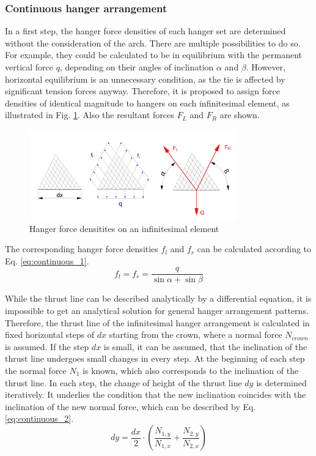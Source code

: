 \subsubsection{Continuous hanger arrangement}\label{app:continuous}
In a first step, the hanger force densities of each hanger set are determined without the consideration of the arch. There are multiple possibilities to do so. For example, they could be calculated to be in equilibrium with the permanent vertical force $q$, depending on their angles of inclination $\alpha$ and $\beta$. However, horizontal equilibrium is an unnecessary condition, as the tie is affected by significant tension forces anyway. Therefore, it is proposed to assign force densities of identical magnitude to hangers on each infinitesimal element, as illustrated in Fig. \ref{fig:continuous_1}. Also the resultant forces $F_L$ and $F_R$ are shown.
\begin{figure}[H]
    \centering
    \includegraphics[width=0.8\textwidth]{overleaf/Appendix/Pictures/continuous_thrust_line_1.PNG}
    \caption{Hanger force densitites on an infinitesimal element}
    \label{fig:continuous_1}
\end{figure}

The corresponding hanger force densities $f_l$ and $f_r$ can be calculated according to Eq. \eqref{eq:continuous_1}.
\begin{equation}
    f_l=f_r=\frac{q}{\sin{\alpha}+ \sin{\beta}}
    \label{eq:continuous_1}
\end{equation}

While the thrust line can be described analytically by a differential equation, it is impossible to get an analytical solution for general hanger arrangement patterns. Therefore, the thrust line of the infinitesimal hanger arrangement is calculated in fixed horizontal steps of $dx$ starting from the crown, where a normal force $N_{crown}$ is assumed. If the step $dx$ is small, it can be assumed, that the inclination of the thrust line undergoes small changes in every step. At the beginning of each step the normal force $N_1$ is known, which also corresponds to the inclination of the thrust line. In each step, the change of height of the thrust line $dy$ is determined iteratively. It underlies the condition that the new inclination coincides with the inclination of the new normal force, which can be described by Eq. \ref{eq:continuous_2}.
\begin{equation}
    dy = \frac{dx}{2} \cdot \left(\frac{N_{1,y}}{N_{1,x}} + \frac{N_{2,y}}{N_{2,x}} \right)
    \label{eq:continuous_2}
\end{equation}

